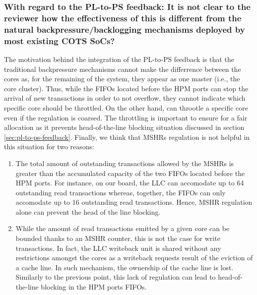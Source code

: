 
        \subsubsection{With regard to the PL-to-PS feedback: It is not clear to the reviewer how the effectiveness of this is different from the natural backpressure/backlogging mechanisms deployed by most existing COTS SoCs?}
            The motivation behind the integration of the PL-to-PS feedback is that the traditional backpressure mechanisms cannot make the differrence between the cores as, for the remaining of the system, they appear as one master (i.e., the core cluster).
            Thus, while the FIFOs located before the HPM ports can stop the arrival of new transactions in order to not overflow, they cannot indicate which specific core should be throttled. On the other hand, \schim can throotle a specific core even if the regulation is coarsed.
            The throttling is important to ensure for a fair allocation as it prevents head-of-the-line blocking situation discussed in section \ref{sec:pl-to-ps-feedback}.
            Finally, we think that MSHRs regulation is not helpful in this situation for two reasons:
            \begin{enumerate}
                \item The total amount of outstanding transactions allowed by the MSHRs is greater than the accumulated capacity of the two FIFOs located before the HPM ports. For instance, on our board, the LLC can accomodate up to 64 outstanding read transactions whereas, together, the FIFOs can only accomodate up to 16 outstanding read transactions. Hence, MSHR regulation alone can prevent the head of the line blocking.
                \item While the amount of read transactions emitted by a given core can be bounded thanks to an MSHR counter, this is not the case for write transactions. In fact, the LLC writeback unit is shared without any restrictions amongst the cores as a writeback requests result of the eviction of a cache line. In such mechanism, the ownership of the cache line is lost. Similarly to the previous point, this lack of regulation can lead to head-of-the-line blocking in the HPM ports FIFOs.
            \end{enumerate}

